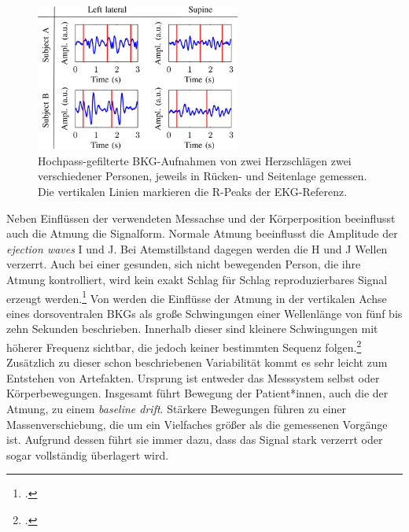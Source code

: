 	\begin{figure}[H]
		\centering
		\includegraphics[width=0.6\textwidth]{pic/bcg2postures.png}
		\caption[\ac{BKG}-Aufnahmen in Rücken- und Seitenlage]{Hochpass-gefilterte \ac{BKG}-Aufnahmen von zwei Herzschlägen zwei verschiedener Personen, jeweils in Rücken- und Seitenlage gemessen. Die vertikalen Linien markieren die R-Peaks der EKG-Referenz.\protect\footnotemark}
		\label{fig:bcg2postures}
	\end{figure}
	
	Neben Einflüssen der verwendeten Messachse und der Körperposition beeinflusst auch die Atmung die Signalform. Normale Atmung beeinflusst die Amplitude der \textit{ejection waves} I und J. Bei Atemstillstand dagegen werden die H und J Wellen verzerrt. Auch bei einer gesunden, sich nicht bewegenden Person, die ihre Atmung kontrolliert, wird kein exakt Schlag für Schlag reproduzierbares Signal erzeugt werden.\footcite[Vgl.][]{Pinheiro2010} Von \citeauthor{Zink2017} werden die Einflüsse der Atmung in der vertikalen Achse eines dorsoventralen \ac{BKG}s als große Schwingungen einer Wellenlänge von fünf bis zehn Sekunden beschrieben. Innerhalb dieser sind kleinere Schwingungen mit höherer Frequenz sichtbar, die jedoch keiner bestimmten Sequenz folgen.\footcite[Vgl.][]{Zink2017} Zusätzlich zu dieser schon beschriebenen Variabilität kommt es sehr leicht zum Entstehen von Artefakten. Ursprung ist entweder das Messsystem selbst oder Körperbewegungen. Insgesamt führt Bewegung der Patient*innen, auch die der Atmung, zu einem \textit{baseline drift}. Stärkere Bewegungen führen zu einer Massenverschiebung, die um ein Vielfaches größer als die gemessenen Vorgänge ist. Aufgrund dessen führt sie immer dazu, dass das Signal stark verzerrt oder sogar vollständig überlagert wird.

